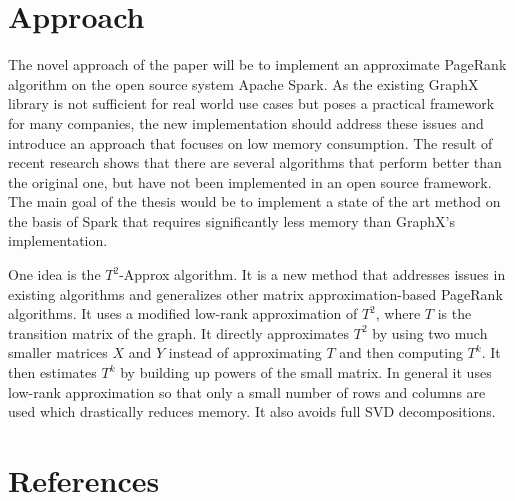 \documentclass[a4paper,12pt]{article}
\begin{document}
\begin{multicols}{2}
\section{Approach}
The novel approach of the paper will be to implement an approximate PageRank algorithm on the open source system Apache Spark. As the existing GraphX library is not sufficient for real world use cases but poses a practical framework for many companies, the new implementation should address these issues and introduce an approach that focuses on low memory consumption. The result of recent research shows that there are several algorithms that perform better than the original one, but have not been implemented in an open source framework. The main goal of the thesis would be to implement a state of the art method on the basis of Spark that requires significantly less memory than GraphX's implementation. 

One idea is the $T^2$-Approx algorithm. It is a new method that addresses issues in existing algorithms and generalizes other matrix approximation-based PageRank algorithms. It uses a modified low-rank approximation of $T^2$, where $T$ is the transition matrix of the graph. It directly approximates $T^2$ by using two much smaller matrices $X$ and $Y$ instead of approximating $T$ and then computing $T^k$. It then estimates $T^k$ by building up powers of the small matrix. In general it uses low-rank approximation so that only a small number of rows and columns are used which drastically reduces memory. It also avoids full SVD decompositions.   




\section{References}

\end{multicols}
\end{document}
